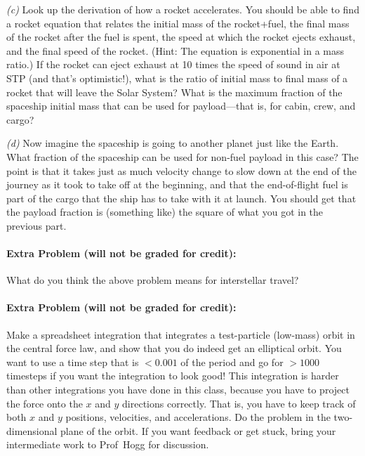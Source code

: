 \documentclass[12pt]{article}
\begin{document}
\textsl{(c)} Look up the derivation of how a rocket accelerates. You
should be able to find a rocket equation that relates the initial mass
of the rocket+fuel, the final mass of the rocket after the fuel is
spent, the speed at which the rocket ejects exhaust, and the final
speed of the rocket. (Hint: The equation is exponential in a mass
ratio.) If the rocket can eject exhaust at 10 times the speed of sound
in air at STP (and that's optimistic!), what is the ratio of initial
mass to final mass of a rocket that will leave the Solar System? What
is the maximum fraction of the spaceship initial mass that can be used
for payload---that is, for cabin, crew, and cargo?

\textsl{(d)} Now imagine the spaceship is going to another planet just
like the Earth. What fraction of the spaceship can be used for
non-fuel payload in this case? The point is that it takes just as much
velocity change to slow down at the end of the journey as it took to
take off at the beginning, and that the end-of-flight fuel is part of
the cargo that the ship has to take with it at launch. You should get
that the payload fraction is (something like) the square of what you got in
the previous part.

\paragraph{Extra Problem (will not be graded for credit):}%
What do you think the above problem means for interstellar travel?

\paragraph{Extra Problem (will not be graded for credit):}%
Make a spreadsheet integration that integrates a test-particle
(low-mass) orbit in the central force law, and show that you do indeed
get an elliptical orbit. You want to use a time step that is $<0.001$
of the period and go for $>1000$ timesteps if you want the integration
to look good! This integration is harder than other integrations you
have done in this class, because you have to project the force onto
the $x$ and $y$ directions correctly. That is, you have to keep track
of both $x$ and $y$ positions, velocities, and accelerations. Do the
problem in the two-dimensional plane of the orbit. If you want
feedback or get stuck, bring your intermediate work to Prof~Hogg for
discussion.
\end{document}
